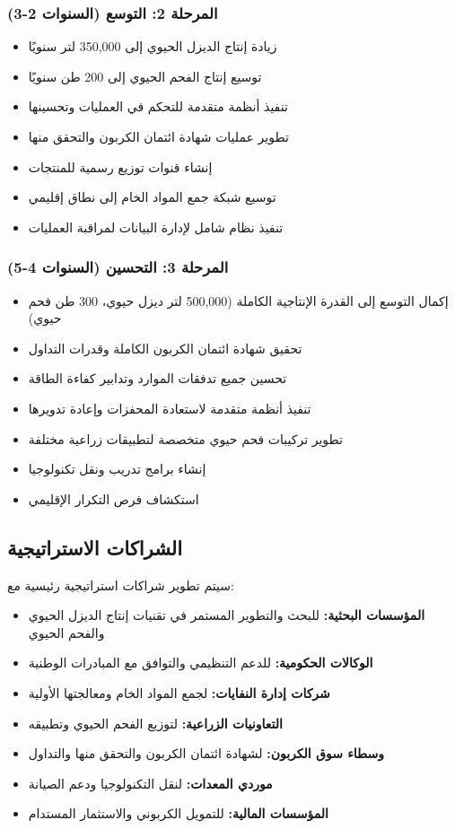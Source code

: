 \subsubsection{المرحلة 2: التوسع (السنوات 2-3)}
\begin{itemize}
    \item زيادة إنتاج الديزل الحيوي إلى 350,000 لتر سنويًا
    \item توسيع إنتاج الفحم الحيوي إلى 200 طن سنويًا
    \item تنفيذ أنظمة متقدمة للتحكم في العمليات وتحسينها
    \item تطوير عمليات شهادة ائتمان الكربون والتحقق منها
    \item إنشاء قنوات توزيع رسمية للمنتجات
    \item توسيع شبكة جمع المواد الخام إلى نطاق إقليمي
    \item تنفيذ نظام شامل لإدارة البيانات لمراقبة العمليات
\end{itemize}

\subsubsection{المرحلة 3: التحسين (السنوات 4-5)}
\begin{itemize}
    \item إكمال التوسع إلى القدرة الإنتاجية الكاملة (500,000 لتر ديزل حيوي، 300 طن فحم حيوي)
    \item تحقيق شهادة ائتمان الكربون الكاملة وقدرات التداول
    \item تحسين جميع تدفقات الموارد وتدابير كفاءة الطاقة
    \item تنفيذ أنظمة متقدمة لاستعادة المحفزات وإعادة تدويرها
    \item تطوير تركيبات فحم حيوي متخصصة لتطبيقات زراعية مختلفة
    \item إنشاء برامج تدريب ونقل تكنولوجيا
    \item استكشاف فرص التكرار الإقليمي
\end{itemize}

\subsection{الشراكات الاستراتيجية}

سيتم تطوير شراكات استراتيجية رئيسية مع:

\begin{itemize}
    \item \textbf{المؤسسات البحثية:} للبحث والتطوير المستمر في تقنيات إنتاج الديزل الحيوي والفحم الحيوي
    \item \textbf{الوكالات الحكومية:} للدعم التنظيمي والتوافق مع المبادرات الوطنية
    \item \textbf{شركات إدارة النفايات:} لجمع المواد الخام ومعالجتها الأولية
    \item \textbf{التعاونيات الزراعية:} لتوزيع الفحم الحيوي وتطبيقه
    \item \textbf{وسطاء سوق الكربون:} لشهادة ائتمان الكربون والتحقق منها والتداول
    \item \textbf{موردي المعدات:} لنقل التكنولوجيا ودعم الصيانة
    \item \textbf{المؤسسات المالية:} للتمويل الكربوني والاستثمار المستدام
\end{itemize}

